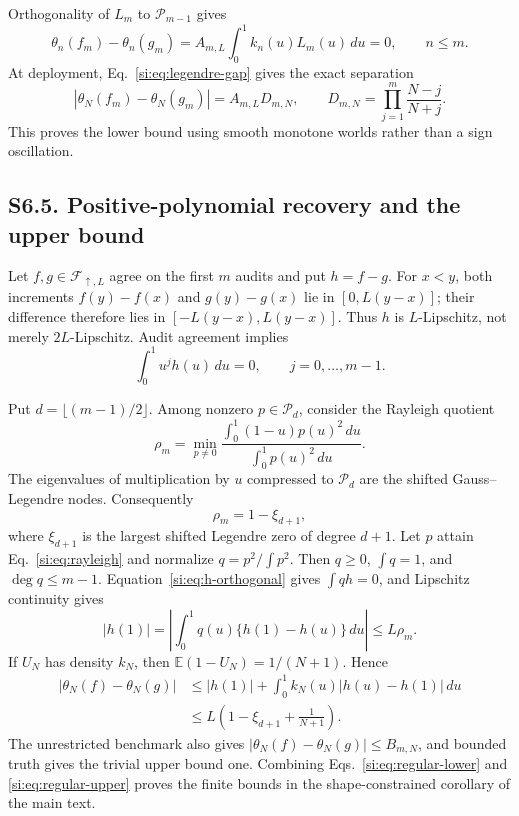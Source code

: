 \documentclass[10pt,twocolumn]{article}
\newcommand{\E}{\mathbb{E}}
\newcommand{\cF}{\mathcal F}
\newcommand{\cP}{\mathcal P}
\begin{document}
Orthogonality of $L_m$ to $\cP_{m-1}$ gives
\begin{equation}
\theta_n(f_m)-\theta_n(g_m)
=A_{m,L}\int_0^1k_n(u)L_m(u)\,du=0,
\qquad n\le m.
\label{si:eq:regular-audit-agreement}
\end{equation}
At deployment, Eq.~\ref{si:eq:legendre-gap} gives the exact separation
\begin{equation}
|\theta_N(f_m)-\theta_N(g_m)|
=A_{m,L}D_{m,N},\qquad
D_{m,N}=\prod_{j=1}^m\frac{N-j}{N+j}.
\label{si:eq:regular-lower}
\end{equation}
This proves the lower bound using smooth monotone worlds rather than a sign oscillation.

\subsection*{S6.5. Positive-polynomial recovery and the upper bound}

Let $f,g\in\cF_{\uparrow,L}$ agree on the first $m$ audits and put $h=f-g$. For $x<y$, both increments $f(y)-f(x)$ and $g(y)-g(x)$ lie in $[0,L(y-x)]$; their difference therefore lies in $[-L(y-x),L(y-x)]$. Thus $h$ is $L$-Lipschitz, not merely $2L$-Lipschitz. Audit agreement implies
\begin{equation}
\int_0^1u^jh(u)\,du=0,\qquad j=0,\ldots,m-1.
\label{si:eq:h-orthogonal}
\end{equation}

Put $d=\lfloor(m-1)/2\rfloor$. Among nonzero $p\in\cP_d$, consider the Rayleigh quotient
\begin{equation}
\rho_m=\min_{p\ne0}
\frac{\int_0^1(1-u)p(u)^2\,du}{\int_0^1p(u)^2\,du}.
\label{si:eq:rayleigh}
\end{equation}
The eigenvalues of multiplication by $u$ compressed to $\cP_d$ are the shifted Gauss--Legendre nodes. Consequently
\begin{equation}
\rho_m=1-\xi_{d+1},
\label{si:eq:gauss-radius}
\end{equation}
where $\xi_{d+1}$ is the largest shifted Legendre zero of degree $d+1$. Let $p$ attain Eq.~\ref{si:eq:rayleigh} and normalize $q=p^2/\int p^2$. Then $q\ge0$, $\int q=1$, and $\deg q\le m-1$. Equation~\ref{si:eq:h-orthogonal} gives $\int qh=0$, and Lipschitz continuity gives
\begin{equation}
|h(1)|
=\left|\int_0^1q(u)\{h(1)-h(u)\}\,du\right|
\le L\rho_m.
\label{si:eq:endpoint-recovery}
\end{equation}
If $U_N$ has density $k_N$, then $\E(1-U_N)=1/(N+1)$. Hence
\begin{align}
|\theta_N(f)-\theta_N(g)|
&\le |h(1)|+\int_0^1k_N(u)|h(u)-h(1)|\,du\nonumber\\
&\le L\left(1-\xi_{d+1}+\frac1{N+1}\right).
\label{si:eq:regular-upper}
\end{align}
The unrestricted benchmark also gives $|\theta_N(f)-\theta_N(g)|\le B_{m,N}$, and bounded truth gives the trivial upper bound one. Combining Eqs.~\ref{si:eq:regular-lower} and \ref{si:eq:regular-upper} proves the finite bounds in the shape-constrained corollary of the main text.
\end{document}
